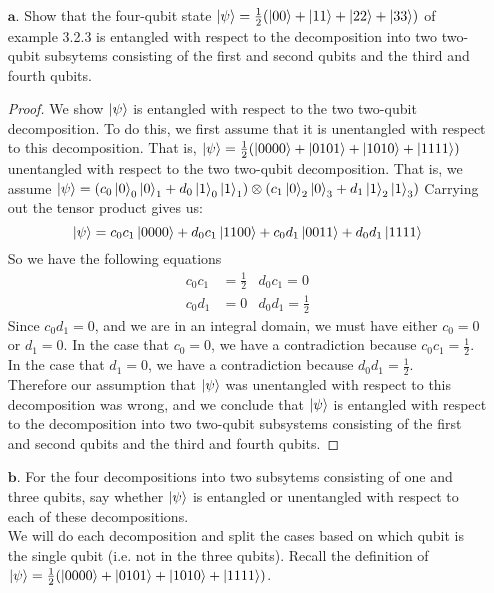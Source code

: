 \documentclass[11pt]{article}
\def\haf{\frac{1}{2}}
\begin{document}
\begin{itemize}
    \item[$\textbf{a.}$] Show that the four-qubit state 
        $\ket{\psi} = \frac{1}{2}(\ket{00} + \ket{11} + \ket{22} + \ket{33})$ of 
        example 3.2.3 is entangled with respect to the decomposition into two 
        two-qubit subsytems consisting of the first and second qubits 
        and the third and fourth qubits.
    \begin{proof}
        We show $\ket{\psi}$ is entangled with respect to the two two-qubit 
        decomposition. To do this, we first assume that it is unentangled with respect
        to this decomposition. That is, $\ket{\psi} = \frac{1}{2}(\ket{0000} + \ket{0101} + \ket{1010} + \ket{1111})$
        unentangled with respect to the two two-qubit decomposition.
        That is, we assume $\ket{\psi} = (c_0\ket{0}_0\ket{0}_1 + d_0\ket{1}_0\ket{1}_1) 
        \otimes (c_1\ket{0}_2\ket{0}_3 + d_1\ket{1}_2\ket{1}_3)$
        Carrying out the tensor product gives us:
        $$\ket{\psi} = c_0c_1\ket{0000} + d_0c_1\ket{1100} + c_0d_1\ket{0011} + d_0d_1\ket{1111}$$
        So we have the following equations 
        \begin{align*}
            c_0c_1 &= \haf & d_0c_1  = 0 \\
            c_0d_1 &= 0 & d_0d_1 = \haf 
        \end{align*}
        Since $c_0d_1 = 0$, and we are in an integral domain, we must have either $c_0 = 0$ or $d_1 = 0$.
        In the case that $c_0 = 0$, we have a contradiction because $c_0c_1 = \haf$.
        In the case that $d_1 = 0$, we have a contradiction because $d_0d_1 = \haf$. \\
        Therefore our assumption that $\ket{\psi}$ was unentangled with respect to this decomposition was wrong,
        and we conclude that $\ket{\psi}$ is entangled with respect to the decomposition into two two-qubit subsystems consisting of the first and second qubits and the third and fourth qubits.
    \end{proof}
    \item[$\textbf{b.}$] For the four decompositions into two subsytems consisting 
        of one and three qubits, say whether $\ket{\psi}$ is entangled or unentangled
        with respect to each of these decompositions. \\
        We will do each decomposition and split the cases based on which qubit is the single qubit (i.e. not in the three qubits).
        Recall the definition of $\ket{\psi} = \haf(\ket{0000} + \ket{0101} + \ket{1010} + \ket{1111}) $.

\end{itemize}
\end{document}
